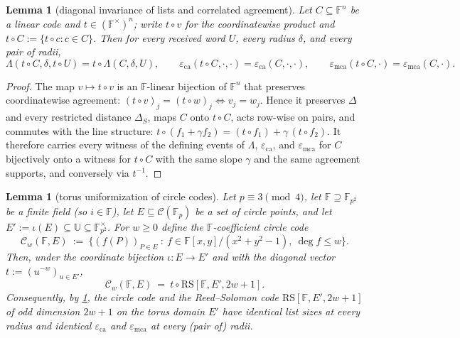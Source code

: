 \documentclass[11pt]{article}
\newtheorem{lemma}[theorem]{Lemma}
\theoremstyle{definition}
\theoremstyle{remark}
\newcommand{\F}{\mathbb{F}}
\newcommand{\RS}{\mathrm{RS}}
\newcommand{\eca}{\varepsilon_{\mathrm{ca}}}
\newcommand{\emca}{\varepsilon_{\mathrm{mca}}}
\newcommand{\dist}{\Delta}
\newcommand{\distS}{\Delta_S}
\newcommand{\Lst}{\Lambda}
\newcommand{\UU}{\mathbb{U}}
\begin{document}
\begin{lemma}[diagonal invariance of lists and correlated agreement]\label{lem:diag-invariance}
Let $C\subseteq\F^n$ be a linear code and $t\in(\F^{\times})^n$; write $t\circ v$ for the coordinatewise product and $t\circ C:=\{t\circ c:c\in C\}$. Then for every received word $U$, every radius $\delta$, and every pair of radii,
\[
\Lst(t\circ C,\delta,t\circ U)=t\circ\Lst(C,\delta,U),
\qquad
\eca(t\circ C,\cdot,\cdot)=\eca(C,\cdot,\cdot),
\qquad
\emca(t\circ C,\cdot)=\emca(C,\cdot).
\]
\end{lemma}

\begin{proof}
The map $v\mapsto t\circ v$ is an $\F$-linear bijection of $\F^n$ that preserves coordinatewise agreement: $(t\circ v)_j=(t\circ w)_j\iff v_j=w_j$. Hence it preserves $\dist$ and every restricted distance $\distS$, maps $C$ onto $t\circ C$, acts row-wise on pairs, and commutes with the line structure: $t\circ(f_1+\gamma f_2)=(t\circ f_1)+\gamma\,(t\circ f_2)$. It therefore carries every witness of the defining events of $\Lst$, $\eca$, and $\emca$ for $C$ bijectively onto a witness for $t\circ C$ with the same slope $\gamma$ and the same agreement supports, and conversely via $t^{-1}$.
\end{proof}

\begin{lemma}[torus uniformization of circle codes]\label{lem:circle-rs}
Let $p\equiv3\pmod4$, let $\F\supseteq\F_{p^2}$ be a finite field \textup(so $i\in\F$\textup), let $E\subseteq\mathcal C(\F_p)$ be a set of circle points, and let $E':=\iota(E)\subseteq\UU\subseteq\F_{p^2}^{\times}$. For $w\ge0$ define the $\F$-coefficient circle code
\[
\mathcal C_w(\F,E)\ :=\ \bigl\{(f(P))_{P\in E}\ :\ f\in\F[x,y]/(x^2+y^2-1),\ \deg f\le w\bigr\}.
\]
Then, under the coordinate bijection $\iota:E\to E'$ and with the diagonal vector $t:=(u^{-w})_{u\in E'}$,
\[
\mathcal C_w(\F,E)\ =\ t\circ\RS[\F,E',2w+1].
\]
Consequently, by \cref{lem:diag-invariance}, the circle code and the Reed--Solomon code $\RS[\F,E',2w+1]$ of odd dimension $2w+1$ on the torus domain $E'$ have identical list sizes at every radius and identical $\eca$ and $\emca$ at every (pair of) radii.
\end{lemma}
\end{document}
